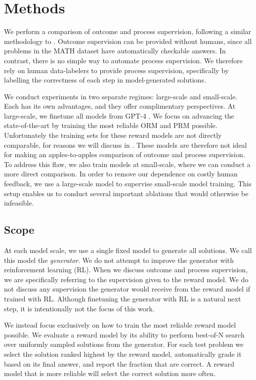 \documentclass{article}
\begin{document}
\section{Methods}

We perform a comparison of outcome and process supervision, following a similar methodology to \cite{uesato2022solving}. Outcome supervision can be provided without humans, since all problems in the MATH dataset have automatically checkable answers. In contrast, there is no simple way to automate process supervision. We therefore rely on human data-labelers to provide process supervision, specifically by labelling the correctness of each step in model-generated solutions.

We conduct experiments in two separate regimes: large-scale and small-scale. Each has its own advantages, and they offer complimentary perspectives. At large-scale, we finetune all models from GPT-4 \citep{gpt4}. We focus on advancing the state-of-the-art by training the most reliable ORM and PRM possible. Unfortunately the training sets for these reward models are not directly comparable, for reasons we will discuss in . These models are therefore not ideal for making an apples-to-apples comparison of outcome and process supervision. To address this flaw, we also train models at small-scale, where we can conduct a more direct comparison. In order to remove our dependence on costly human feedback, we use a large-scale model to supervise small-scale model training. This setup enables us to conduct several important ablations that would otherwise be infeasible.

\subsection{Scope}

At each model scale, we use a single fixed model to generate all solutions. We call this model the \textit{generator}. We do not attempt to improve the generator with reinforcement learning (RL). When we discuss outcome and process supervision, we are specifically referring to the supervision given to the reward model. We do not discuss any supervision the generator would receive from the reward model if trained with RL. Although finetuning the generator with RL is a natural next step, it is intentionally not the focus of this work.

We instead focus exclusively on how to train the most reliable reward model possible. We evaluate a reward model by its ability to perform best-of-N search over uniformly sampled solutions from the generator. For each test problem we select the solution ranked highest by the reward model, automatically grade it based on its final answer, and report the fraction that are correct. A reward model that is more reliable will select the correct solution more often.
\end{document}
